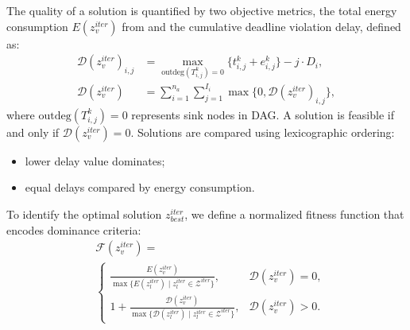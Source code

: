 \documentclass{IEEEtaes}
\begin{document}
The quality of a solution is quantified by two objective metrics, the total energy consumption $E(z^{iter}_{v})$ from  and the cumulative deadline violation delay, defined as:
\begin{subequations}\label{equ:delay}
\begin{align}
    \mathcal{D}(z^{iter}_{v})_{i,j}&=\max\limits_{\text{outdeg}(T_{i,j}^{k})=0}\{t_{i,j}^k+e_{i,j}^k\}-j\cdot D_i,\\
    \mathcal{D}(z^{iter}_{v})&=
    \sum\limits_{i=1}^{n_a}\sum\limits_{j=1}^{I_i}\max\{0,\mathcal{D}(z^{iter}_{v})_{i,j}\},
\end{align}
\end{subequations}
where $\text{outdeg}(T_{i,j}^{k})=0$ represents sink nodes in DAG. A solution is feasible if and only if $\mathcal{D}(z^{iter}_{v})=0$. Solutions are compared using lexicographic ordering:
\begin{itemize}
\item{lower delay value dominates;}
\item{equal delays compared by energy consumption.}
\end{itemize}
To identify the optimal solution $z_{best}^{iter}$, we define a normalized fitness function that encodes dominance criteria:
\begin{equation}
\begin{aligned}
    &\mathcal{F}(z_{v}^{iter})=\\
    &\begin{cases}
        \frac{E(z^{iter}_{v})}{\max\{E(z_{l}^{iter})\mid{z_{l}^{iter}\in \mathcal{Z}^{iter}}\}},&\mathcal{D}(z_{v}^{iter})=0,\\
        1+\frac{\mathcal{D}(z^{iter}_{v})}{\max\{\mathcal{D}(z_{l}^{iter})\mid{z_{l}^{iter}\in \mathcal{Z}^{iter}}\}},&\mathcal{D}(z_{v}^{iter})>0.
    \end{cases}
\end{aligned}
\label{equ:fitness}
\end{equation}
\end{document}
